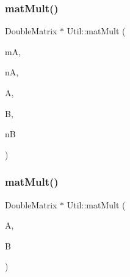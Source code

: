 \mbox{\label{class_l_i_b___l_a_1_1_util_a282add89f6fa75cb32e7552b18b4bff0}} 
\subsubsection{\texorpdfstring{mat\+Mult()}{matMult()}\hspace{0.1cm}{\footnotesize\ttfamily [3/6]}}
{\footnotesize\ttfamily Double\+Matrix $\ast$ Util\+::mat\+Mult (\begin{DoxyParamCaption}\item[{unsigned \hyperlink{lp__lib_8h_adeb9ec6400320e4923ac9d836d509ddb}{int}}]{mA,  }\item[{unsigned \hyperlink{lp__lib_8h_adeb9ec6400320e4923ac9d836d509ddb}{int}}]{nA,  }\item[{Double\+Matrix \&}]{A,  }\item[{Double\+Matrix \&}]{B,  }\item[{unsigned \hyperlink{lp__lib_8h_adeb9ec6400320e4923ac9d836d509ddb}{int}}]{nB }\end{DoxyParamCaption})\hspace{0.3cm}{\ttfamily [static]}}

\mbox{\label{class_l_i_b___l_a_1_1_util_a842f660dbd1e0eec33f400c85fc05177}} 
\subsubsection{\texorpdfstring{mat\+Mult()}{matMult()}\hspace{0.1cm}{\footnotesize\ttfamily [4/6]}}
{\footnotesize\ttfamily Double\+Matrix $\ast$ Util\+::mat\+Mult (\begin{DoxyParamCaption}\item[{Double\+Matrix \&}]{A,  }\item[{Double\+Matrix \&}]{B }\end{DoxyParamCaption})\hspace{0.3cm}{\ttfamily [static]}}

\mbox{\label{class_l_i_b___l_a_1_1_util_a1c07f17145c4cc1e6c19b693ca5047d2}} 
